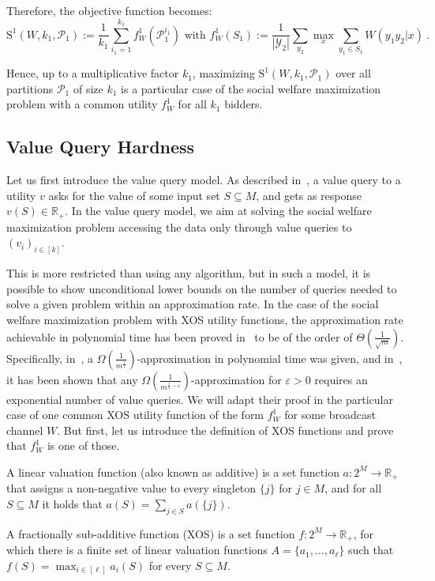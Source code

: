 Therefore, the objective function becomes:
\[ \mathrm{S}^1(W,k_1,\mathcal{P}_1) := \frac{1}{k_1}\sum_{i_1=1}^{k_1} f_W^1(\mathcal{P}_1^{i_1}) \text{ with } f_W^1(S_1) := \frac{1}{|\mathcal{Y}_2|}\sum_{y_2} \max_x \sum_{y_1 \in S_1} W(y_1y_2|x)\ .\]


Hence, up to a multiplicative factor $k_1$, maximizing $\mathrm{S}^1(W,k_1,\mathcal{P}_1)$ over all partitions $\mathcal{P}_1$ of size $k_1$ is a particular case of the social welfare maximization problem with a common utility $f_W^1$ for all $k_1$ bidders.

\subsection{Value Query Hardness}
Let us first introduce the value query model. As described in~\cite{DS06,MSV08}, a value query to a utility $v$ asks for the value of some input set $S \subseteq M$, and gets as response $v(S) \in \mathbb{R}_+$. In the value query model, we aim at solving the social welfare maximization problem accessing the data only through value queries to $(v_i)_{i \in [k]}$.

This is more restricted than using any algorithm, but in such a model, it is possible to show unconditional lower bounds on the number of queries needed to solve a given problem within an approximation rate. In the case of the social welfare maximization problem with \textrm{XOS} utility functions, the approximation rate achievable in polynomial time has been proved in~\cite{DS06,MSV08} to be of the order of $\Theta\left(\frac{1}{\sqrt{m}}\right)$. Specifically, in~\cite{DS06}, a $\Omega\left(\frac{1}{m^{\frac{1}{2}}}\right)$-approximation in polynomial time was given, and in~\cite{MSV08}, it has been shown that any $\Omega\left(\frac{1}{m^{\frac{1}{2}-\varepsilon}}\right)$-approximation for $\varepsilon > 0$ requires an exponential number of value queries. We will adapt their proof in the particular case of one common \textrm{XOS} utility function of the form $f_W^1$ for some broadcast channel $W$. But first, let us introduce the definition of \textrm{XOS} functions and prove that $f_W^1$ is one of those.

\begin{definition}
  A linear valuation function (also known as additive) is a set function $a : 2^M \rightarrow \mathbb{R}_+$ that assigns a non-negative value to every singleton $\{ j\}$ for $j \in M$, and for all $S \subseteq M$ it holds that $a(S) = \sum_{j \in S} a(\{ j\})$.

  A fractionally sub-additive function (\textrm{XOS}) is a set function $f : 2^M \rightarrow \mathbb{R}_+$, for which there is a finite set of linear valuation functions $A = \{ a_1, \ldots, a_{\ell} \}$ such that $f(S) = \max_{i \in [\ell]} a_i(S)$ for every $S \subseteq M$.
\end{definition}

